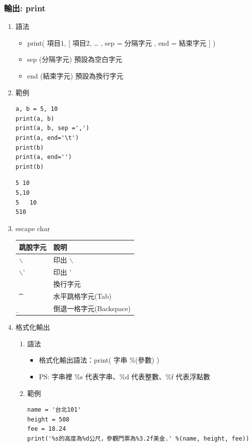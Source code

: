 \documentclass[a4paper,12pt]{article}
\begin{document}
\subsubsection{輸出: print}
\label{sec:orge21230c}
\begin{enumerate}
\item 語法
\label{sec:orgdbfd770}
\begin{itemize}
\item print( 項目1, [ 項目2, … , sep = 分隔字元 , end = 結束字元 ] )\\
\item sep (分隔字元) 預設為空白字元\\
\item end (結束字元) 預設為換行字元\n \\
\end{itemize}
\item 範例
\label{sec:org43c9a9b}
\lstset{breaklines=true,language=Python,label= ,caption= ,captionpos=b,firstnumber=1,numbers=left}
\begin{lstlisting}
a, b = 5, 10
print(a, b)
print(a, b, sep =',')
print(a, end='\t')
print(b)
print(a, end='')
print(b)
\end{lstlisting}

\begin{verbatim}
5 10
5,10
5	10
510
\end{verbatim}
\item escape char
\label{sec:org196faff}
\begin{center}
\begin{tabular}{ll}
\hline
跳脫字元 & 說明\\
\hline
$\backslash$\ & 印出 $\backslash$\\
$\backslash$' & 印出 '\\
\n & 換行字元\\
\t & 水平跳格字元(Tab)\\
\b & 倒退一格字元(Backspace)\\
\hline
\end{tabular}
\end{center}

\item 格式化輸出
\label{sec:orgacb6e1d}
\begin{enumerate}
\item 語法
\label{sec:org73436d5}
\begin{itemize}
\item 格式化輸出語法：print( 字串  \%(參數) ) \\
\item PS: 字串裡 \%s 代表字串、\%d 代表整數、\%f 代表浮點數\\
\end{itemize}
\item 範例
\label{sec:org9fe253a}
\lstset{breaklines=true,language=Python,label= ,caption= ,captionpos=b,firstnumber=1,numbers=left}
\begin{lstlisting}
name = '台北101'
height = 508
fee = 18.24
print('%s的高度為%d公尺，參觀門票為%3.2f美金.' %(name, height, fee))


\end{lstlisting}
\end{enumerate}
\end{enumerate}
\end{document}
